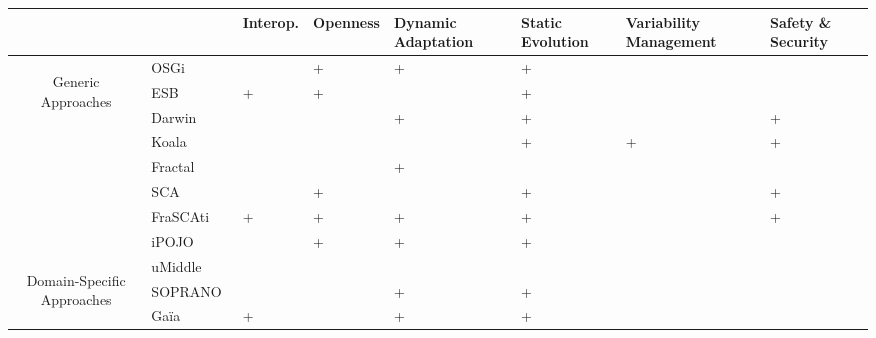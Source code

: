 \begin{table}[h!]
\begin{tabular}{cm{}|| >{\centering\arraybackslash}m{}| >{\centering\arraybackslash}m{}| >{\centering\arraybackslash}m{}| >{\centering\arraybackslash}m{}| >{\centering}m{}| >{\centering\arraybackslash}m{}|}
 & & {\tiny Interop.} & {\tiny Openness} & {\tiny Dynamic Adaptation} & {\tiny Static Evolution} & {\tiny Variability Management} & {\tiny Safety \& Security}\\
 \hline\hline
 \multirow{7}{7mm}{\begin{sideways}\parbox{25mm}{\small\centering Generic Approaches}\end{sideways}}
 &{\small OSGi~\cite{OSGI:r4}}				&  & + & + & + &  &  \\ 
 &{\small ESB~\cite{Chappell:2004}}								& + & + &  & + &  &  \\
 \cline{2-8}%
 &{\small Darwin~\cite{Georgiadis:2002}}		&  &  & + & + &   & + \\ 
 &{\small Koala~\cite{RobVanOmmering:2000}}	&  &  &   & + & + & + \\
 &{\small Fractal~\cite{Bruneton:2006}}		&  &  & + &   &   &  \\
 \cline{2-8}%
 &{\small SCA~\cite{sca:specs}}				&   & + &  & + &  & +\\
 &{\small FraSCAti~\cite{Melisson:2010}}	 	& + & + & + & + &  & + \\
 &{\small iPOJO~\cite{Escoffier:2007}}		&  & + & + & + &  &  \\
 \hline\hline
 \multirow{9}{7mm}{\begin{sideways}\parbox{30mm}{\small\centering  Domain-Specific Approaches}\end{sideways}} 
 &{\small uMiddle~\cite{Nakazawa:2007}}		&  &  &  &  &  &  \\
 &{\small SOPRANO~\cite{Wolf:2010}}			&  &  & + & + &  &  \\
 &{\small Ga\"ia~\cite{Roman:2002}}			& + &  & + & + &  &  \\

\end{tabular}
\end{table}
